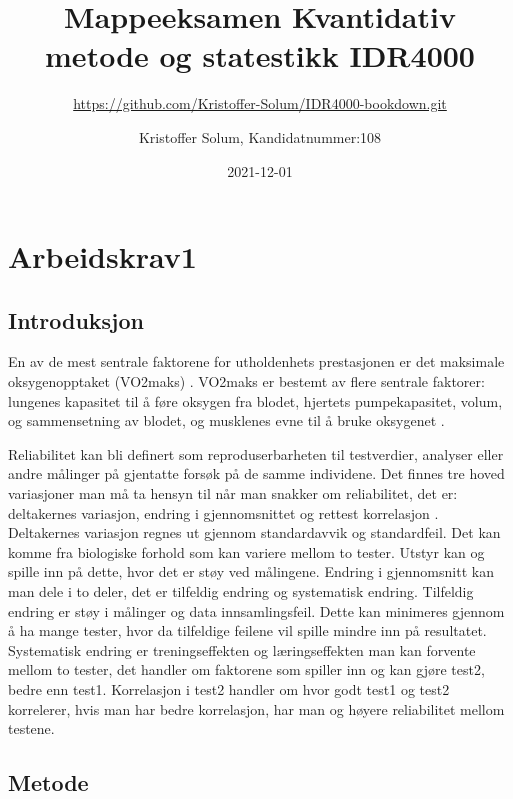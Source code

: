\documentclass[
]{book}
\title{Mappeeksamen Kvantidativ metode og statestikk IDR4000}
\subtitle{\url{https://github.com/Kristoffer-Solum/IDR4000-bookdown.git}}
\author{Kristoffer Solum, Kandidatnummer:108}
\date{2021-12-01}
\begin{document}
\maketitle

{
\setcounter{tocdepth}{1}
\tableofcontents
}
\hypertarget{arbeidskrav1}{%
\chapter{Arbeidskrav1}\label{arbeidskrav1}}

\hypertarget{introduksjon}{%
\section{Introduksjon}\label{introduksjon}}

En av de mest sentrale faktorene for utholdenhets prestasjonen er det maksimale oksygenopptaket (VO2maks) \citet{bassett2000}. VO2maks er bestemt av flere sentrale faktorer: lungenes kapasitet til å føre oksygen fra blodet, hjertets pumpekapasitet, volum, og sammensetning av blodet, og musklenes evne til å bruke oksygenet \citet{bassett2000}.

Reliabilitet kan bli definert som reproduserbarheten til testverdier, analyser eller andre målinger på gjentatte forsøk på de samme individene. Det finnes tre hoved variasjoner man må ta hensyn til når man snakker om reliabilitet, det er: deltakernes variasjon, endring i gjennomsnittet og rettest korrelasjon \citet{hopkins2000}. Deltakernes variasjon regnes ut gjennom standardavvik og standardfeil. Det kan komme fra biologiske forhold som kan variere mellom to tester. Utstyr kan og spille inn på dette, hvor det er støy ved målingene. Endring i gjennomsnitt kan man dele i to deler, det er tilfeldig endring og systematisk endring. Tilfeldig endring er støy i målinger og data innsamlingsfeil. Dette kan minimeres gjennom å ha mange tester, hvor da tilfeldige feilene vil spille mindre inn på resultatet. Systematisk endring er treningseffekten og læringseffekten man kan forvente mellom to tester, det handler om faktorene som spiller inn og kan gjøre test2, bedre enn test1. Korrelasjon i test2 handler om hvor godt test1 og test2 korrelerer, hvis man har bedre korrelasjon, har man og høyere reliabilitet mellom testene.

\hypertarget{metode}{%
\section{Metode}\label{metode}}
\end{document}
